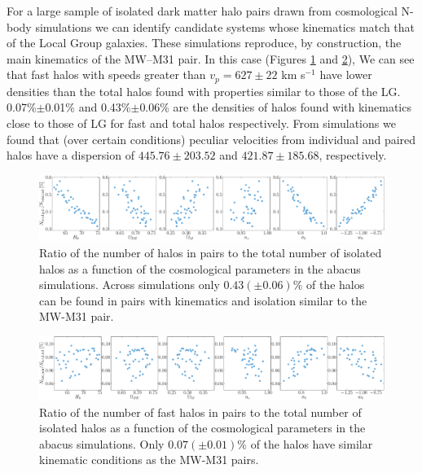 \documentclass[usenatbib]{mnras}
\newcommand{\kms}{{\ifmmode{\ {\rm km\, {s}^{-1}}}\else{\ km s$^{-1}$}\fi}}
\begin{document}
For a large sample of isolated dark matter halo pairs drawn from cosmological N-body simulations we can identify candidate systems whose kinematics match that of the Local Group galaxies. These simulations reproduce, by construction, the main kinematics of the MW–M31 pair. In this case (Figures \ref{fig:ratio_total} and \ref{fig:ratio_fast}), We can see that fast halos with speeds greater than $v_p=627\pm22$ km s$^{-1}$  have lower densities than the total halos found with properties similar to those of the LG. 0.07\%$\pm$0.01\% and 0.43\%$\pm$0.06\% are the densities of halos found with kinematics close to those of LG for fast and total halos respectively. From simulations we found that (over certain conditions) peculiar velocities from individual and paired halos have a dispersion of $445.76\pm 203.52$ \kms and $421.87\pm 185.68$, respectively. 

\begin{figure}
\begin{center}
  \includegraphics[width=1.0\textwidth]{ratio_pair_total_ind_total.pdf}
\end{center}
\caption{Ratio of the number of halos in pairs to the total number of isolated halos as a function of the cosmological parameters in the abacus simulations. Across simulations only $0.43 (\pm 0.06) \%$ of the halos can be found in pairs with kinematics and isolation similar to the MW-M31 pair.} 
\label{fig:ratio_total}
\end{figure}

\begin{figure}
\begin{center}
  \includegraphics[width=1.0\textwidth]{ratio_pair_high_ind_total.pdf}
\end{center}
\caption{Ratio of the number of fast halos in pairs to the total number of isolated halos as a function of the cosmological parameters in the abacus simulations. Only $0.07 (\pm0.01) \%$ of the halos have similar kinematic conditions as the MW-M31 pairs.}
\label{fig:ratio_fast}
\end{figure}
\end{document}
